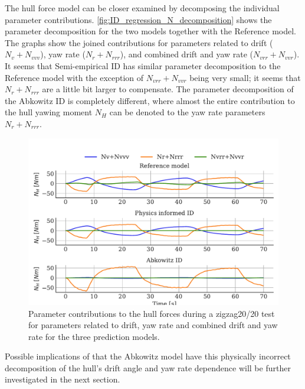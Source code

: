 The hull force model can be closer examined by decomposing the individual parameter contributions. \autoref{fig:ID_regression_N_decomposition} shows the parameter decomposition for the two models together with the Reference model. The graphs show the joined contributions for parameters related to drift ($N_v+N_{vvv}$), yaw rate ($N_r+N_{rrr}$), and combined drift and yaw rate ($N_{vrr}+N_{vvr}$). It seems that Semi-empirical ID has similar parameter decomposition to the Reference model with the exception of $N_{vrr}+N_{vvr}$ being very small; it seems that $N_r+N_{rrr}$ are a little bit larger to compensate.
The parameter decomposition of the Abkowitz ID is completely different, where almost the entire contribution to the hull yawing moment $N_H$ can be denoted to the yaw rate parameters $N_r+N_{rrr}$. 
\begin{figure}[h]
    \begin{center}
        \includegraphics[width=\columnwidth]{figures/result_ID_regression.ID_regression_N_decomposition.pdf}
        \caption{Parameter contributions to the hull forces during a zigzag20/20 test for parameters related to drift, yaw rate and combined drift and yaw rate for the three prediction models.}
        \label{fig:ID_regression_N_decomposition}
    \end{center}
\end{figure}

Possible implications of that the Abkowitz model have this physically incorrect decomposition of the hull's drift angle and yaw rate dependence will be further investigated in the next section.
